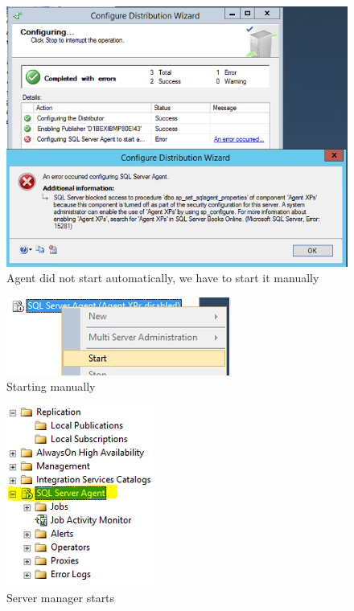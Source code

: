 \documentclass[english]{article}
\begin{document}
\begin{figure}[H]
\centerline{\includegraphics[scale=0.8]{administration/rep/8}}
\caption{Agent did not start automatically, we have to start it manually}
\end{figure}

\begin{figure}[H]
\centerline{\includegraphics[scale=0.8]{administration/rep/9}}
\caption{Starting manually}
\end{figure}

\begin{figure}[H]
\centerline{\includegraphics[scale=0.8]{administration/rep/10}}
\caption{Server manager starts}
\end{figure}
\end{document}
